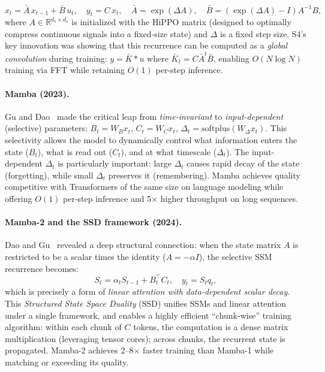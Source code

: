 \documentclass[11pt,a4paper]{article}
\begin{document}
\begin{equation}
x_t = \bar{A}\, x_{t-1} + \bar{B}\, u_t, \quad y_t = C\, x_t, \quad \bar{A} = \exp(\Delta A), \quad \bar{B} = (\exp(\Delta A) - I) A^{-1} B,
\label{eq:s4}
\end{equation}
where $A \in \mathbb{R}^{d_s \times d_s}$ is initialized with the HiPPO matrix (designed to optimally compress continuous signals into a fixed-size state) and $\Delta$ is a fixed step size. S4's key innovation was showing that this recurrence can be computed as a \emph{global convolution} during training: $y = \bar{K} * u$ where $\bar{K}_t = C \bar{A}^t \bar{B}$, enabling $O(N \log N)$ training via FFT while retaining $O(1)$ per-step inference.

\paragraph{Mamba (2023).}
Gu and Dao~\cite{gu2024mamba} made the critical leap from \emph{time-invariant} to \emph{input-dependent} (selective) parameters: $B_t = W_B x_t$, $C_t = W_C x_t$, $\Delta_t = \text{softplus}(W_\Delta x_t)$. This selectivity allows the model to dynamically control what information enters the state ($B_t$), what is read out ($C_t$), and at what timescale ($\Delta_t$). The input-dependent $\Delta_t$ is particularly important: large $\Delta_t$ causes rapid decay of the state (forgetting), while small $\Delta_t$ preserves it (remembering). Mamba achieves quality competitive with Transformers of the same size on language modeling while offering $O(1)$ per-step inference and 5$\times$ higher throughput on long sequences.

\paragraph{Mamba-2 and the SSD framework (2024).}
Dao and Gu~\cite{dao2024mamba2} revealed a deep structural connection: when the state matrix $A$ is restricted to be a scalar times the identity ($A = -\alpha I$), the selective SSM recurrence becomes:
\begin{equation}
S_t = \alpha_t S_{t-1} + B_t^\top C_t, \quad y_t = S_t q_t,
\end{equation}
which is precisely a form of \emph{linear attention with data-dependent scalar decay}. This \emph{Structured State Space Duality} (SSD) unifies SSMs and linear attention under a single framework, and enables a highly efficient ``chunk-wise'' training algorithm: within each chunk of $C$ tokens, the computation is a dense matrix multiplication (leveraging tensor cores); across chunks, the recurrent state is propagated. Mamba-2 achieves 2--8$\times$ faster training than Mamba-1 while matching or exceeding its quality.
\end{document}
